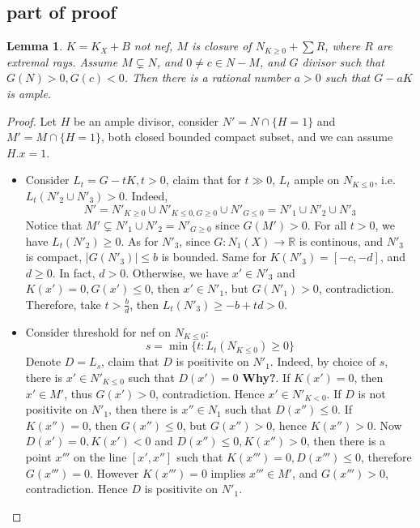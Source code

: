 \documentclass{article}
\newtheorem{lem}[defn]{Lemma}
\begin{document}
\subsection{part of proof}
\begin{lem}
  $ K=K_X+B $ not nef, $ M $ is closure of $  N_{K\geqslant 0}+\sum R $, where $ R $ are extremal rays. Assume $ M\subsetneq N $, and $ 0\neq c\in N-M $, and $ G $ divisor such that $ G(N)>0,G(c)<0 $. Then there is a rational number $ a>0 $ such that $ G-aK $ is ample.
\end{lem}

\begin{proof}
  Let $ H $ be an ample divisor, consider $ N'=N\cap \{H=1\} $ and $ M'=M\cap \{H=1\} $, both closed bounded compact subset, and we can assume $ H.x=1 $. 
  \begin{itemize}
    \item Consider $ L_t=G-tK, t>0 $, claim that for $ t\gg 0 $, $ L_t $ ample on $ N_{K\leqslant 0} $, i.e. $ L_t(N'_2 \cup N'_3)>0 $. Indeed, 
    \[ N'=N'_{K\geqslant 0}\cup N'_{K\leqslant 0,G\geqslant 0}\cup N'_{G\leqslant 0}=N'_1\cup N'_2 \cup N'_3 \]
    Notice that $ M'\subsetneq N'_1\cup N'_2=N'_{G\geqslant 0} $ since $ G(M')>0 $. For all $ t>0 $, we have $ L_t(N'_2)\geqslant0 $. As for $ N'_3 $, since $ G:N_1(X)\to \mathbb{R} $ is continous, and $ N'_3 $ is compact, $ |G(N'_3)|\leqslant b $ is bounded. Same for $ K(N'_3)=[-c,-d] $, and $ d\geqslant 0 $. In fact, $ d>0 $. Otherwise, we have $ x'\in N'_3 $ and $ K(x')=0, G(x')\leqslant 0 $, then $ x'\in N'_1 $, but $ G(N'_1)>0 $, contradiction. Therefore, take $ t> \frac{b}{d} $, then $ L_t(N'_3)\geqslant -b+td>0 $.
    \item   Consider threshold for nef on $ N_{K\leqslant 0} $:
    \[ s=\min \{t: L_t(N_{K\leqslant 0})\geqslant0  \} \]
    Denote $ D=L_s $, claim that $ D $ is positivite on $ N'_1 $. Indeed, by choice of $ s $, there is $ x'\in N'_{K\leqslant 0} $ such that $ D(x')=0 $ \textbf{Why?}. If $ K(x')=0 $, then $ x'\in M' $, thus $ G(x')>0 $, contradiction. Hence $ x'\in N'_{K<0} $. If $ D $ is not positivite on $ N'_1 $, then there is $ x''\in N_1 $ such that $ D(x'')\leqslant 0 $. If $ K(x'')=0 $, then $ G(x'')\leqslant 0 $, but $ G(x'')>0 $, hence $ K(x'')>0 $. Now $ D(x')=0,K(x')<0 $ and $ D(x'')\leqslant 0,K(x'')>0 $, then there is  a point $ x''' $ on the line $ [x',x''] $ such that  $ K(x''')=0,D(x''')\leqslant 0 $,  therefore $ G(x''')=0 $. However $ K(x''')=0 $ implies $ x'''\in M' $, and $ G(x''')>0 $, contradiction. Hence $ D $ is positivite on $ N'_1 $.

\end{itemize}
\end{proof}
\end{document}
